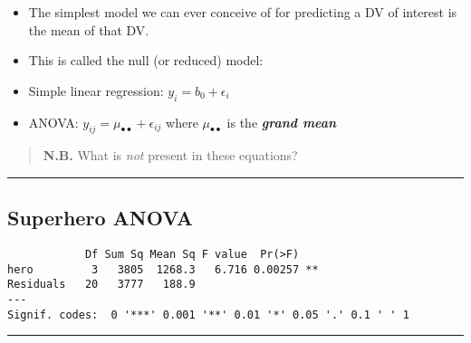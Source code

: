 \documentclass[]{article}
\newenvironment{Shaded}{\begin{snugshade}}{\end{snugshade}}
\newcommand{\DataTypeTok}[1]{\textcolor[rgb]{0.13,0.29,0.53}{#1}}
\newcommand{\KeywordTok}[1]{\textcolor[rgb]{0.13,0.29,0.53}{\textbf{#1}}}
\newcommand{\NormalTok}[1]{#1}
\newcommand{\OperatorTok}[1]{\textcolor[rgb]{0.81,0.36,0.00}{\textbf{#1}}}
\newcommand{\StringTok}[1]{\textcolor[rgb]{0.31,0.60,0.02}{#1}}
\providecommand{\tightlist}{%
  \setlength{\itemsep}{0pt}\setlength{\parskip}{0pt}}
\begin{document}
\begin{itemize}
\tightlist
\item
  The simplest model we can ever conceive of for predicting a DV of
  interest is the mean of that DV.
\item
  This is called the null (or reduced) model:
\item
  Simple linear regression: \(y_i=b_0+\epsilon_i\)
\item
  ANOVA: \(y_{ij}=\mu_{\bullet\bullet}+\epsilon_{ij}\) where
  \(\mu_{\bullet\bullet}\) is the \textbf{\emph{grand mean}}
\end{itemize}

\begin{quote}
\textbf{N.B.} What is \emph{not} present in these equations?
\end{quote}

\begin{center}\rule{0.5\linewidth}{\linethickness}\end{center}

\hypertarget{superhero-anova}{%
\subsection{Superhero ANOVA}\label{superhero-anova}}

\begin{Shaded}
\end{Shaded}

\begin{verbatim}
            Df Sum Sq Mean Sq F value  Pr(>F)   
hero         3   3805  1268.3   6.716 0.00257 **
Residuals   20   3777   188.9                   
---
Signif. codes:  0 '***' 0.001 '**' 0.01 '*' 0.05 '.' 0.1 ' ' 1
\end{verbatim}

\begin{center}\rule{0.5\linewidth}{\linethickness}\end{center}
\end{document}
